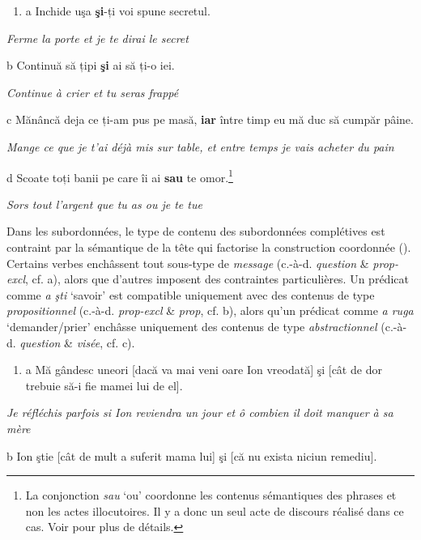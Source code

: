 \begin{enumerate}
\item \label{bkm:Ref272839516}a  Inchide uşa \textbf{şi}-ți voi spune secretul.


\end{enumerate}
{\itshape
Ferme la porte et je te dirai le secret}

  b  Continuă să țipi \textbf{şi} ai să ți-o iei.

{\itshape
Continue à crier et tu seras frappé}

  c  Mănâncă deja ce ți-am pus pe masă, \textbf{iar} între timp eu mă duc să cumpăr pâine.

{\itshape
Mange ce que je t'ai déjà mis sur table, et entre temps je vais acheter du pain}

  d  Scoate toți banii pe care îi ai \textbf{sau} te omor.\footnote{La conjonction \textit{sau} `ou' coordonne les contenus sémantiques des phrases et non les actes illocutoires. Il y a donc un seul acte de discours réalisé dans ce cas. Voir \citet{Piscone2009} pour plus de détails.}

    \textit{Sors tout l'argent que tu as ou je te tue} 

Dans les subordonnées, le type de contenu des subordonnées complétives est contraint par la sémantique de la tête qui factorise la construction coordonnée (\citet{Piscone2009}). Certains verbes enchâssent tout sous-type de \textit{message} (c.-à-d. \textit{question} \& \textit{prop-excl}, cf. a), alors que d'autres imposent des contraintes particulières. Un prédicat comme \textit{a şti} `savoir' est compatible uniquement avec des contenus de type \textit{propositionnel} (c.-à-d. \textit{prop-excl} \& \textit{prop}, cf. b), alors qu'un prédicat comme \textit{a ruga} `demander/prier' enchâsse uniquement des contenus de type \textit{abstractionnel} (c.-à-d. \textit{question} \& \textit{visée}, cf. c). 


\begin{enumerate}
\item \label{bkm:Ref269938414}a  Mă gândesc uneori [dacă va mai veni oare Ion vreodată] şi [cât de dor trebuie să-i fie mamei lui de el].


\end{enumerate}
{\itshape
Je réfléchis parfois si Ion reviendra un jour et ô combien il doit manquer à sa mère}

  b  Ion ştie [cât de mult a suferit mama lui] şi [că nu exista niciun remediu].  

